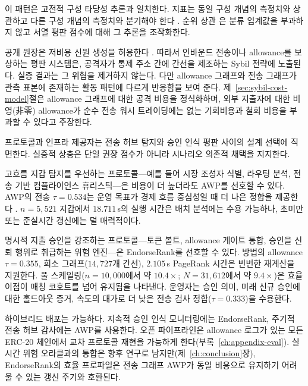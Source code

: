 이 패턴은 고전적 구성 타당성 추론과 일치한다. 지표는 동일 구성 개념의 측정치와 상관하고 다른 구성 개념의 측정치와 분기해야 한다 . 순위 상관 은 분류 임계값을 부과하지 않고 서열 평판 점수에 대해 그 추론을 조작화한다.


공개 원장은 저비용 신원 생성을 허용한다 . 따라서 인바운드 전송이나 allowance를 보상하는 평판 시스템은, 공격자가 통제 주소 간에 간선을 제조하는 Sybil 전략에 노출된다. 실증 결과는 그 위협을 제거하지 않는다. 다만 allowance 그래프와 전송 그래프가 관측 표본에 존재하는 활동 패턴에 다르게 반응함을 보여 준다. 제~\ref{sec:sybil-cost-model}절은 allowance 그래프에 대한 공격 비용을 정식화하며, 외부 지출자에 대한 비영(非零) allowance가 순수 전송 워시 트레이딩에는 없는 기회비용과 철회 비용을 부과할 수 있다고 주장한다.


프로토콜과 인프라 제공자는 전송 허브 탐지와 승인 인식 평판 사이의 설계 선택에 직면한다. 실증적 상충은 단일 권장 점수가 아니라 시나리오 의존적 채택을 지지한다.


고흐름 지갑 탐지를 우선하는 프로토콜---예를 들어 시장 조성자 식별, 라우팅 분석, 전송 기반 컴플라이언스 휴리스틱---은 비용이 더 높더라도 AWP를 선호할 수 있다. AWP의 전송 $\tau=0.534$는 운영 목표가 경제 흐름 중심성일 때 더 나은 정합을 제공한다 . $n=5{,}521$ 지갑에서 $18.711$\,s의 실행 시간은 배치 분석에는 수용 가능하나, 초미만 또는 준실시간 갱신에는 덜 매력적이다.


명시적 지출 승인을 강조하는 프로토콜---토큰 볼트, allowance 게이트 통합, 승인을 신뢰 행위로 취급하는 위험 엔진---은 EndorseRank를 선호할 수 있다. 방법의 allowance $\tau=0.355$, 희소 그래프($14{,}727$개 간선), $2.105$\,s PageRank 시간은 빈번한 재계산을 지원한다. 풀 스케일링($n=10{,}000$에서 약 $10.4\times$; $N=31{,}612$에서 약 $9.4\times$)은 효율 이점이 매칭 코호트를 넘어 유지됨을 나타낸다. 운영자는 승인 의미, 미래 신규 승인에 대한 홀드아웃 증거, 속도의 대가로 더 낮은 전송 검사 정합($\tau=0.333$)을 수용한다.


하이브리드 배포는 가능하다. 지속적 승인 인식 모니터링에는 EndorseRank, 주기적 전송 허브 감사에는 AWP를 사용한다. 오픈 파이프라인은 allowance 로그가 있는 모든 ERC-20 체인에서 교차 프로토콜 재현을 가능하게 한다(부록~\ref{ch:appendix-eval}). 실시간 위험 오라클과의 통합은 향후 연구로 남지만(제~\ref{ch:conclusion}장), EndorseRank의 효율 프로파일은 전송 그래프 AWP가 동일 비용으로 유지하기 어려울 수 있는 갱신 주기와 호환된다.

